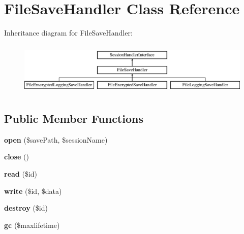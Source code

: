 \hypertarget{class_pes_1_1_session_1_1_save_handler_1_1_file_save_handler}{}\section{File\+Save\+Handler Class Reference}
\label{class_pes_1_1_session_1_1_save_handler_1_1_file_save_handler}
Inheritance diagram for File\+Save\+Handler\+:\begin{figure}[H]
\begin{center}
\leavevmode
\includegraphics[height=2.545455cm]{class_pes_1_1_session_1_1_save_handler_1_1_file_save_handler}
\end{center}
\end{figure}
\subsection*{Public Member Functions}
\begin{DoxyCompactItemize}
\item 
\mbox{\label{class_pes_1_1_session_1_1_save_handler_1_1_file_save_handler_ac70d1623e67e5b6d1859856dcef15d82}} 
{\bfseries open} (\$save\+Path, \$session\+Name)
\item 
\mbox{\label{class_pes_1_1_session_1_1_save_handler_1_1_file_save_handler_aa69c8bf1f1dcf4e72552efff1fe3e87e}} 
{\bfseries close} ()
\item 
\mbox{\label{class_pes_1_1_session_1_1_save_handler_1_1_file_save_handler_afa59bebedda70c37b94c2efc35da83f3}} 
{\bfseries read} (\$id)
\item 
\mbox{\label{class_pes_1_1_session_1_1_save_handler_1_1_file_save_handler_a5f277b5f0e4e2154cddc9a3a0d2bf57d}} 
{\bfseries write} (\$id, \$data)
\item 
\mbox{\label{class_pes_1_1_session_1_1_save_handler_1_1_file_save_handler_a726fa8a4b4b187b9ca32ba427aac8137}} 
{\bfseries destroy} (\$id)
\item 
\mbox{\label{class_pes_1_1_session_1_1_save_handler_1_1_file_save_handler_a57aff7ee0656d8aa75d545fb8b3ae35d}} 
{\bfseries gc} (\$maxlifetime)
\end{DoxyCompactItemize}


